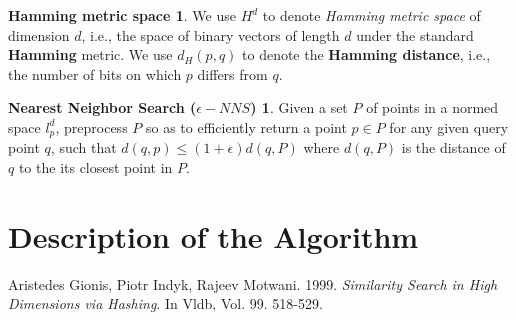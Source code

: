 \documentclass[12pt, a4paper]{article}
\theoremstyle{definition}
\newtheorem*{hamming}{Hamming metric space}
\newtheorem*{nns}{Nearest Neighbor Search ($\epsilon-NNS$)}
\begin{document}
\begin{hamming}
  We use $H^d$ to denote \textit{Hamming metric space} of dimension $d$, i.e., the space of binary vectors of length $d$ under the standard \textbf{Hamming} metric. We use $d_H(p,q)$ to denote the \textbf{Hamming distance}, i.e., the number of bits on which $p$ differs from $q$.
\end{hamming}

\begin{nns}
  Given a set $P$ of points in a normed space $l^{d}_p$, preprocess $P$ so as to efficiently return a point $p \in P$ for any given query point $q$, such that $d(q, p) \leq (1 + \epsilon)d(q,P)$ where $d(q, P)$ is the distance of $q$ to the its closest point
in $P$.
\end{nns}

\section{Description of the Algorithm}

\begin{thebibliography}{9}
  Aristedes Gionis, Piotr Indyk, Rajeev Motwani. 1999. \textit{Similarity Search in High Dimensions via Hashing}. In Vldb, Vol. 99. 518-529.
\end{thebibliography}
\end{document}
